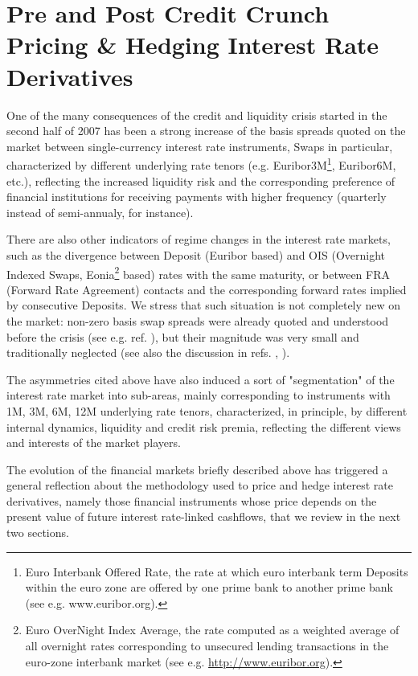\documentclass[11pt,reqno]{amsart}
\begin{document}
\section{Pre and Post Credit Crunch Pricing \& Hedging Interest Rate Derivatives}
\label{sec:Pricing}
One of the many consequences of the credit and liquidity crisis started in the second half of 2007 has been a strong increase of the basis spreads quoted on the market between single-currency interest rate instruments, Swaps in particular, characterized by different underlying rate tenors (e.g. Euribor3M\footnote{Euro Interbank Offered Rate, the rate at which euro interbank term Deposits within the euro zone are offered by one prime bank to another prime bank (see e.g. www.euribor.org).}, Euribor6M, etc.), reflecting the increased liquidity risk and the corresponding preference of financial institutions for receiving payments with higher frequency (quarterly instead of semi-annualy, for instance).
\par
There are also other indicators of regime changes in the interest rate markets, such as the divergence between Deposit (Euribor based) and OIS (Overnight Indexed Swaps, Eonia\footnote{Euro OverNight Index Average, the rate computed as a weighted average of all overnight rates corresponding to unsecured lending transactions in the euro-zone interbank market (see e.g. \url{http://www.euribor.org}).} based) rates with the same maturity, or between FRA (Forward Rate Agreement) contacts and the corresponding forward rates implied by consecutive Deposits.
We stress that such situation is not completely new on the market: non-zero basis swap spreads were already quoted and understood before the crisis (see e.g. ref. \cite{TucPor03}), but their magnitude was very small and traditionally neglected (see also the discussion in refs. \cite{Mor08}, \cite{Mer09}).
\par
The asymmetries cited above have also induced a sort of "segmentation" of the interest rate market into sub-areas, mainly corresponding to instruments with 1M, 3M, 6M, 12M underlying rate tenors, characterized, in principle, by different internal dynamics, liquidity and credit risk premia, reflecting the different views and interests of the market players.
\par
The evolution of the financial markets briefly described above has triggered a general reflection about the methodology used to price and hedge interest rate derivatives, namely those financial instruments whose price depends on the present value of future interest rate-linked cashflows, that we review in the next two sections.
\end{document}
